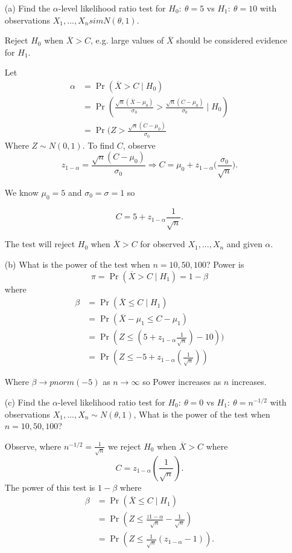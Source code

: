 \documentclass{tufte-book}
\begin{document}
\begin{enumerate}
\item[(a)] Find the $\alpha$-level likelihood ratio test for $H_0: \ \theta=5$ vs $H_1: \ \theta=10$ with observations $X_1,...,X_n sim N(\theta,1)$.

Reject $H_0$ when $\overline{X} > C$, e.g. large values of $\overline{X}$ should be considered evidence for $H_1$.

Let
\begin{align*}
\alpha &= \Pr(\overline{X} > C \mid H_0)\\
&= \Pr(\frac{\sqrt{n}(\overline{X}-\mu_0)}{\sigma_0} > \frac{\sqrt{n}(C-\mu_0)}{\sigma_0} \mid H_0)\\
&= \Pr(Z > \frac{\sqrt{n}(C-\mu_0)}{\sigma_0}
\end{align*}
Where $Z \sim N(0,1)$. To find $C$, observe
\[ z_{1-\alpha} = \frac{\sqrt{n}(C-\mu_0)}{\sigma_0} \Rightarrow C = \mu_0 + z_{1-\alpha}\big(\frac{\sigma_0}{\sqrt{n}}\big). \]

We know $\mu_0=5$ and $\sigma_0=\sigma=1$ so

\[ C = 5 + z_{1-\alpha}\frac{1}{\sqrt{n}}. \]

The test will reject $H_0$ when $\overline{X} > C$ for observed $X_1,...,X_n$ and given $\alpha$.

\item[(b)] What is the power of the test when $n=10,50,100$?
Power is
\[ \pi = \Pr(\overline{X}>C \mid H_1) = 1-\beta\]
where
\begin{align*}
\beta &= \Pr(\overline{X} \leq C \mid H_1)\\
&= \Pr(\overline{X} - \mu_1 \leq C-\mu_1)\\
&= \Pr(Z \leq (5+z_{1-\alpha}\frac{1}{\sqrt{n}})-10))\\
&= \Pr(Z \leq -5 + z_{1-\alpha}(\frac{1}{\sqrt{n}}))
\end{align*}

Where $\beta \rightarrow pnorm(-5)$ as $n \rightarrow \infty$ so Power increases as $n$ increases.

\item[(c)] Find the $\alpha$-level likelihood ratio test for $H_0: \ \theta=0$ vs $H_1: \ \theta = n^{-1/2}$ with observations $X_1,...,X_n \sim N(\theta, 1)$,  What is the power of the test when $n=10,50,100$?

Observe, where $n^{-1/2}=\frac{1}{\sqrt{n}}$ we reject $H_0$ when $\overline{X} > C$ where
\[ C= z_{1-\alpha}(\frac{1}{\sqrt{n}}). \]
The power of this test is $1-\beta$ where
\begin{align*}
\beta &= \Pr(\overline{X} \leq C \mid H_1)\\
&=\Pr(Z \leq \frac{z{1-\alpha}}{\sqrt{n}} - \frac{1}{\sqrt{n}}) \\
&= \Pr(Z \leq \frac{1}{\sqrt{n}}(z_{1-\alpha} - 1 )).
\end{align*}


\end{enumerate}
\end{document}
